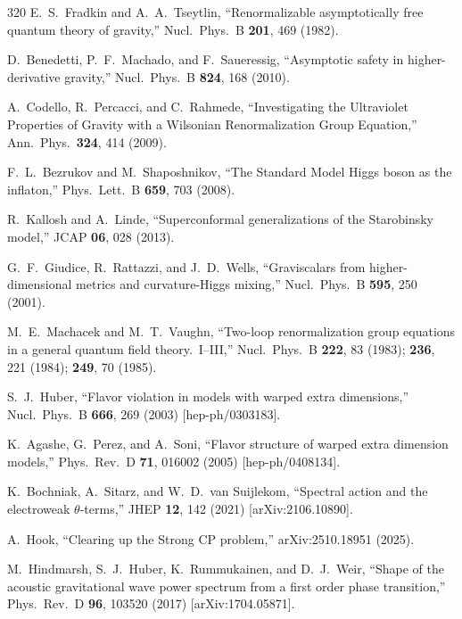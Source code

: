 \begin{thebibliography}{320}
E.~S.~Fradkin and A.~A.~Tseytlin,
``Renormalizable asymptotically free quantum theory of gravity,''
Nucl.\ Phys.\ B \textbf{201}, 469 (1982).

D.~Benedetti, P.~F.~Machado, and F.~Saueressig,
``Asymptotic safety in higher-derivative gravity,''
Nucl.\ Phys.\ B \textbf{824}, 168 (2010).

A.~Codello, R.~Percacci, and C.~Rahmede,
``Investigating the Ultraviolet Properties of Gravity with a Wilsonian Renormalization Group Equation,''
Ann.\ Phys.\ \textbf{324}, 414 (2009).

F.~L.~Bezrukov and M.~Shaposhnikov,
``The Standard Model Higgs boson as the inflaton,''
Phys.\ Lett.\ B \textbf{659}, 703 (2008).

R.~Kallosh and A.~Linde,
``Superconformal generalizations of the Starobinsky model,''
JCAP \textbf{06}, 028 (2013).

G.~F.~Giudice, R.~Rattazzi, and J.~D.~Wells,
``Graviscalars from higher-dimensional metrics and curvature-Higgs mixing,''
Nucl.\ Phys.\ B \textbf{595}, 250 (2001).

M.~E.~Machacek and M.~T.~Vaughn,
``Two-loop renormalization group equations in a general quantum field theory.\ I--III,''
Nucl.\ Phys.\ B \textbf{222}, 83 (1983); \textbf{236}, 221 (1984); \textbf{249}, 70 (1985).

S.~J.~Huber,
``Flavor violation in models with warped extra dimensions,''
Nucl.\ Phys.\ B \textbf{666}, 269 (2003)
[hep-ph/0303183].

K.~Agashe, G.~Perez, and A.~Soni,
``Flavor structure of warped extra dimension models,''
Phys.\ Rev.\ D \textbf{71}, 016002 (2005)
[hep-ph/0408134].

K.~Bochniak, A.~Sitarz, and W.~D.~van Suijlekom,
``Spectral action and the electroweak $\theta$-terms,''
JHEP \textbf{12}, 142 (2021)
[arXiv:2106.10890].

A.~Hook,
``Clearing up the Strong CP problem,''
arXiv:2510.18951 (2025).

M.~Hindmarsh, S.~J.~Huber, K.~Rummukainen, and D.~J.~Weir,
``Shape of the acoustic gravitational wave power spectrum from a first order phase transition,''
Phys.\ Rev.\ D \textbf{96}, 103520 (2017)
[arXiv:1704.05871].


\end{thebibliography}
